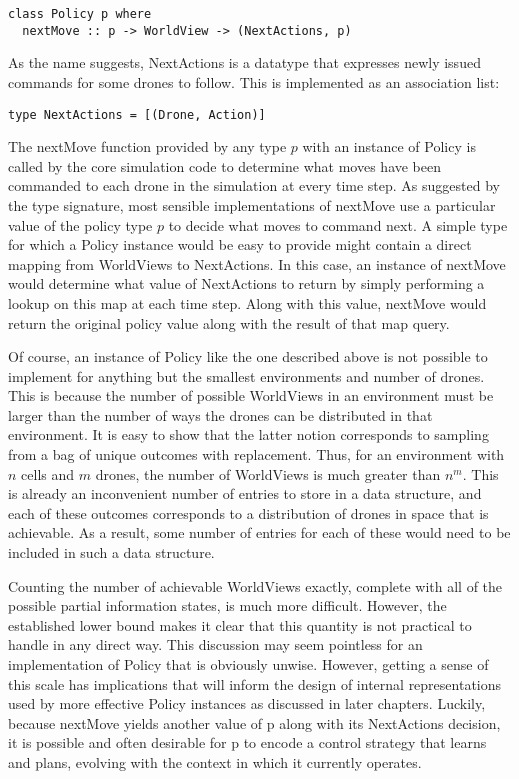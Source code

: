 \begin{verbatim}
class Policy p where
  nextMove :: p -> WorldView -> (NextActions, p)
\end{verbatim}

As the name suggests, NextActions is a datatype that expresses newly issued commands for some drones to follow. This is implemented as an association list:

\begin{verbatim}
type NextActions = [(Drone, Action)]
\end{verbatim}

The nextMove function provided by any type $p$ with an instance of Policy is called by the core simulation code to determine what moves have been commanded to each drone in the simulation at every time step. As suggested by the type signature, most sensible implementations of nextMove use a particular value of the policy type $p$ to decide what moves to command next. A simple type for which a Policy instance would be easy to provide might contain a direct mapping from WorldViews to NextActions. In this case, an instance of nextMove would determine what value of NextActions to return by simply performing a lookup on this map at each time step. Along with this value, nextMove would return the original policy value along with the result of that map query. 

Of course, an instance of Policy like the one described above is not possible to implement for anything but the smallest environments and number of drones. This is because the number of possible WorldViews in an environment must be larger than the number of ways the drones can be distributed in that environment. It is easy to show that the latter notion corresponds to sampling from a bag of unique outcomes with replacement. Thus, for an environment with $n$ cells and $m$ drones, the number of WorldViews is much greater than $n^m$. This is already an inconvenient number of entries to store in a data structure, and each of these outcomes corresponds to a distribution of drones in space that is achievable. As a result, some number of entries for each of these would need to be included in such a data structure.

Counting the number of achievable WorldViews exactly, complete with all of the possible partial information states, is much more difficult. However, the established lower bound makes it clear that this quantity is not practical to handle in any direct way. This discussion may seem pointless for an implementation of Policy that is obviously unwise. However, getting a sense of this scale has implications that will inform the design of internal representations used by more effective Policy instances as discussed in later chapters. Luckily, because nextMove yields another value of p along with its NextActions decision, it is possible and often desirable for p to encode a control strategy that learns and plans, evolving with the context in which it currently operates.

